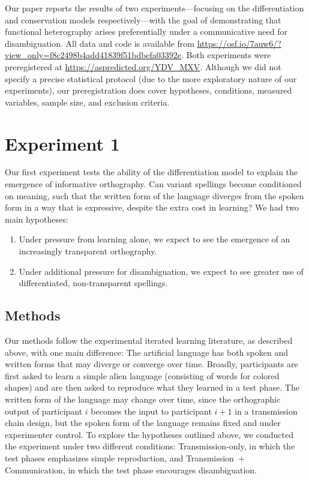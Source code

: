 \documentclass[doc,biblatex]{apa7}
\begin{document}
Our paper reports the results of two experiments---focusing on the differentiation and conservation models respectively---with the goal of demonstrating that functional heterography arises preferentially under a communicative need for disambiguation. All data and code is available from \url{https://osf.io/7auw6/?view_only=f8c2498b4add41839f51bdbefa03392e}. Both experiments were preregistered at \url{https://aspredicted.org/YDV_MXV}. Although we did not specify a precise statistical protocol (due to the more exploratory nature of our experiments), our preregistration does cover hypotheses, conditions, measured variables, sample size, and exclusion criteria.


\section{Experiment 1}

Our first experiment tests the ability of the differentiation model to explain the emergence of informative orthography. Can variant spellings become conditioned on meaning, such that the written form of the language diverges from the spoken form in a way that is expressive, despite the extra cost in learning? We had two main hypotheses:
\begin{enumerate}
	\item Under pressure from learning alone, we expect to see the emergence of an increasingly transparent orthography.
	\item Under additional pressure for disambiguation, we expect to see greater use of differentiated, non-transparent spellings.
\end{enumerate}

\subsection{Methods}

Our methods follow the experimental iterated learning literature, as described above, with one main difference: The artificial language has both spoken and written forms that may diverge or converge over time. Broadly, participants are first asked to learn a simple alien language (consisting of words for colored shapes) and are then asked to reproduce what they learned in a test phase. The written form of the language may change over time, since the orthographic output of participant $i$ becomes the input to participant $i+1$ in a transmission chain design, but the spoken form of the language remains fixed and under experimenter control. To explore the hypotheses outlined above, we conducted the experiment under two different conditions: Transmission-only, in which the test phases emphasizes simple reproduction, and Transmission~+ Communication, in which the test phase encourages disambiguation.
\end{document}
